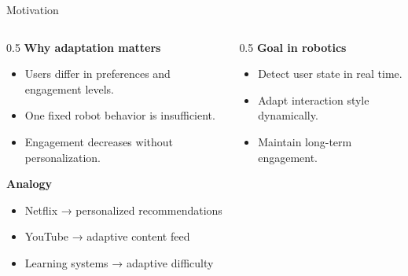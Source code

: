 \documentclass[aspectratio=169,10pt]{beamer}
\begin{document}
\begin{frame}{Motivation}
\footnotesize

\begin{columns}[T]

\begin{column}{0.5\textwidth}
\textbf{Why adaptation matters}
\begin{itemize}\footnotesize
    \item Users differ in preferences and engagement levels.
    \item One fixed robot behavior is insufficient.
    \item Engagement decreases without personalization.
\end{itemize}

\textbf{Analogy}
\begin{itemize}\footnotesize
    \item Netflix → personalized recommendations
    \item YouTube → adaptive content feed
    \item Learning systems → adaptive difficulty
\end{itemize}
\end{column}

\begin{column}{0.5\textwidth}
\textbf{Goal in robotics}
\begin{itemize}\footnotesize
    \item Detect user state in real time.
    \item Adapt interaction style dynamically.
    \item Maintain long-term engagement.
\end{itemize}
\end{column}

\end{columns}
\end{frame}

\end{document}
